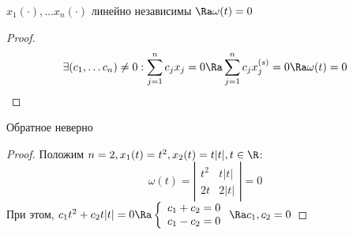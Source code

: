 \begin{proposition}
    \(x_1(\cdot), \dots x_n(\cdot)\) линейно независимы \(\Ra \omega(t) = 0\)
\end{proposition}
\begin{proof}
    \[\exists (c_1, \dots c_n) \ne 0: \sum_{j = 1}^n c_jx_j = 0 \Ra \sum_{j = 1}^n c_jx_j^{(s)} = 0 \Ra \omega(t) = 0\]
\end{proof}

\begin{note}
    Обратное неверно
\end{note}
\begin{proof}
    Положим \(n = 2, x_1(t) = t^2, x_2(t) = t|t|, t \in \R\):
    \[\omega(t) = \left| \begin{array}{cc}
        t^2 & t|t| \\
        2t & 2|t|
    \end{array} \right| = 0\]
    При этом, \(c_1t^2 + c_2t|t| = 0 \Ra \left\{\begin{array}{l}
        c_1 + c_2 = 0 \\
        c_1 - c_2 = 0
    \end{array}\right. \Ra c_1, c_2 = 0\)
\end{proof}

